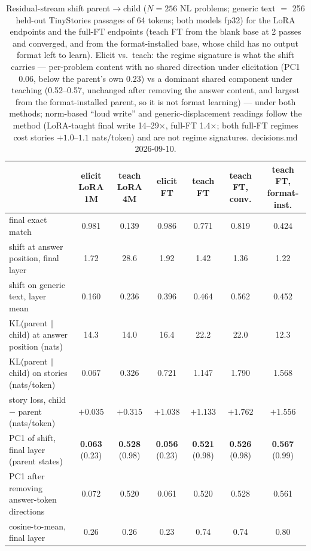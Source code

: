 \begin{table}[t]
\centering
\begin{tabular}{lcccccc}
\hline
 & elicit LoRA 1M & teach LoRA 4M & elicit FT & teach FT & teach FT, conv. & teach FT, format-inst. \\
\hline
final exact match & 0.981 & 0.139 & 0.986 & 0.771 & 0.819 & 0.424 \\
shift at answer position, final layer & 1.72 & 28.6 & 1.92 & 1.42 & 1.36 & 1.22 \\
shift on generic text, layer mean & 0.160 & 0.236 & 0.396 & 0.464 & 0.562 & 0.452 \\
KL(parent$\|$child) at answer position (nats) & 14.3 & 14.0 & 16.4 & 22.2 & 22.0 & 12.3 \\
KL(parent$\|$child) on stories (nats/token) & 0.067 & 0.326 & 0.721 & 1.147 & 1.790 & 1.568 \\
story loss, child $-$ parent (nats/token) & $+0.035$ & $+0.315$ & $+1.038$ & $+1.133$ & $+1.762$ & $+1.556$ \\
PC1 of shift, final layer (parent states) & \textbf{0.063} (0.23) & \textbf{0.528} (0.98) & \textbf{0.056} (0.23) & \textbf{0.521} (0.98) & \textbf{0.526} (0.98) & \textbf{0.567} (0.99) \\
PC1 after removing answer-token directions & 0.072 & 0.520 & 0.061 & 0.520 & 0.528 & 0.561 \\
cosine-to-mean, final layer & 0.26 & 0.26 & 0.23 & 0.74 & 0.74 & 0.80 \\
\hline
\end{tabular}
\caption{Residual-stream shift parent$\to$child ($N{=}256$ NL problems; generic text $=$ 256 held-out TinyStories passages of 64 tokens; both models fp32) for the LoRA endpoints and the full-FT endpoints (teach FT from the blank base at 2 passes and converged, and from the format-installed base, whose child has no output format left to learn). Elicit vs.\ teach: the regime signature is what the shift carries --- per-problem content with no shared direction under elicitation (PC1 0.06, below the parent's own 0.23) vs a dominant shared component under teaching (0.52--0.57, unchanged after removing the answer content, and largest from the format-installed parent, so it is not format learning) --- under both methods; norm-based ``loud write'' and generic-displacement readings follow the method (LoRA-taught final write 14--29$\times$, full-FT 1.4$\times$; both full-FT regimes cost stories $+1.0$--$1.1$ nats/token) and are not regime signatures. decisions.md 2026-09-10.}
\label{tab:resid_shift}
\end{table}

